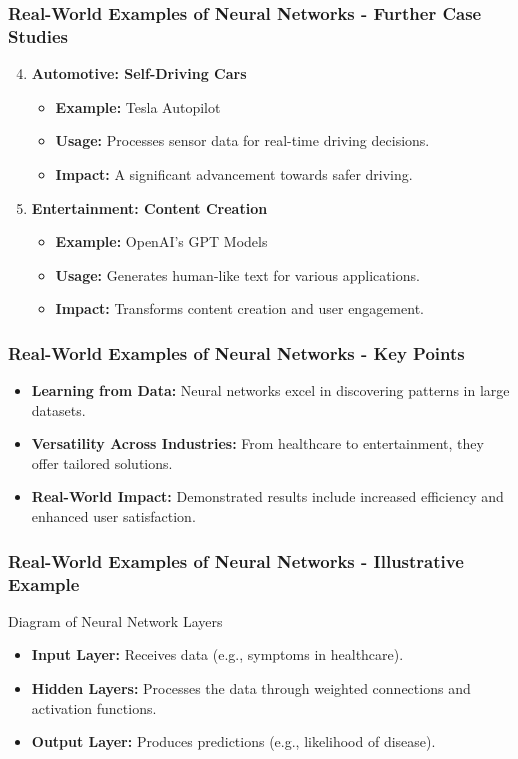 \documentclass[aspectratio=169]{beamer}
\begin{document}
\begin{frame}[fragile]
    \frametitle{Real-World Examples of Neural Networks - Further Case Studies}
    \begin{enumerate}
        \setcounter{enumi}{3}
        \item \textbf{Automotive: Self-Driving Cars}
            \begin{itemize}
                \item \textbf{Example:} Tesla Autopilot
                \item \textbf{Usage:} Processes sensor data for real-time driving decisions.
                \item \textbf{Impact:} A significant advancement towards safer driving.
            \end{itemize}

        \item \textbf{Entertainment: Content Creation}
            \begin{itemize}
                \item \textbf{Example:} OpenAI's GPT Models
                \item \textbf{Usage:} Generates human-like text for various applications.
                \item \textbf{Impact:} Transforms content creation and user engagement.
            \end{itemize}
    \end{enumerate}
\end{frame}

\begin{frame}[fragile]
    \frametitle{Real-World Examples of Neural Networks - Key Points}
    \begin{itemize}
        \item \textbf{Learning from Data:} Neural networks excel in discovering patterns in large datasets.
        \item \textbf{Versatility Across Industries:} From healthcare to entertainment, they offer tailored solutions.
        \item \textbf{Real-World Impact:} Demonstrated results include increased efficiency and enhanced user satisfaction.
    \end{itemize}
\end{frame}

\begin{frame}[fragile]
    \frametitle{Real-World Examples of Neural Networks - Illustrative Example}
    \begin{block}{Diagram of Neural Network Layers}
        \begin{itemize}
            \item \textbf{Input Layer:} Receives data (e.g., symptoms in healthcare).
            \item \textbf{Hidden Layers:} Processes the data through weighted connections and activation functions.
            \item \textbf{Output Layer:} Produces predictions (e.g., likelihood of disease).
        \end{itemize}
    \end{block}
\end{frame}
\end{document}
